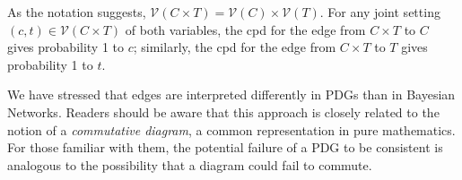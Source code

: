 \documentclass{article}
\theoremstyle{plain}
\theoremstyle{definition}
\theoremstyle{remark}
\newcommand{\V}{\mathcal V}
\numberwithin{equation}{section}
\begin{document}
\begin{constr}
As the notation suggests, $\V( C \times T) = \V(C) \times \V(T)$.
For any joint setting $(c,t) \in \V(C \times T)$ of both variables, the cpd for
the edge from $C \times T$ to $C$ gives probability 1 to $c$;
similarly, the cpd for the edge from $ C \times T$ to $T$ gives probability 1 to $t$.
\end{constr}

\begin{vfull}
    We have stressed that edges are interpreted differently in PDGs than
    in Bayesian Networks. Readers should be aware that this approach is
    closely related to the notion of a \emph{commutative diagram}, a
    common representation in pure mathematics. For those familiar with
    them, the potential failure of a PDG to be consistent is analogous to
    the possibility that a diagram could fail to commute. 
\end{vfull}
\end{document}

